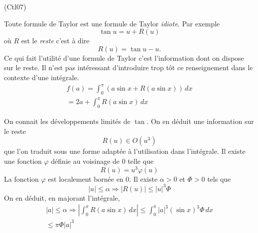 \begin{tiny}(Ctl07)\end{tiny} Toute formule de Taylor est une formule de Taylor \emph{idiote}. Par exemple
\begin{displaymath}
  \tan u = u + R(u)
\end{displaymath}
où $R$ est le \emph{reste} c'est à dire
\begin{displaymath}
  R(u) = \tan u -u.
\end{displaymath}
Ce qui fait l'utilité d'une formule de Taylor c'est l'information dont on dispose sur le reste. Il n'est pas intéressant d'introduire trop tôt ce renseignement dans le contexte d'une intégrale.
\begin{multline*}
  f(a) = \int_{0}^{\pi}\left( a\sin x + R(a\sin x)\right)\,dx \\
  = 2a + \int_{0}^{\pi}R(a\sin x)\,dx
\end{multline*}

On connait les développements limités de $\tan$. On en déduit une information sur le reste
\begin{displaymath}
  R(u) \in O(u^3)
\end{displaymath}
que l'on traduit sous une forme adaptée à l'utilisation dans l'intégrale. Il existe une fonction $\varphi$ définie au voisinage de $0$ telle que 
\begin{displaymath}
  R(u) = u^3 \varphi(u)
\end{displaymath}
La fonction $\varphi$ est localement bornée en $0$. Il existe $\alpha>0$ et $\Phi>0$ tels que
\begin{displaymath}
  |u|\leq \alpha \Rightarrow |R(u)|\leq |u|^3 \Phi
\end{displaymath}
On en déduit, en majorant l'intégrale,
\begin{multline*}
  |a|\leq \alpha \Rightarrow \left|\int_{0}^{\pi}R(a\sin x)\,dx\right| 
  \leq \int_{0}^{\pi}|a|^3(\sin x)^3 \Phi\,dx\\
  \leq \pi \Phi |a|^3
\end{multline*}

